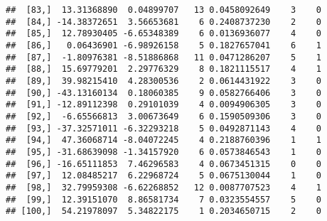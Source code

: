 \documentclass[]{article}
\begin{document}
\begin{verbatim}
##  [83,]  13.31368890  0.04899707   13 0.0458092649    3    0
##  [84,] -14.38372651  3.56653681    6 0.2408737230    2    0
##  [85,]  12.78930405 -6.65348389    6 0.0136936077    4    0
##  [86,]   0.06436901 -6.98926158    5 0.1827657041    6    1
##  [87,]  -1.80976381 -8.51886868   11 0.0471286207    5    1
##  [88,]  15.69779201  2.29776329    8 0.1821115517    4    1
##  [89,]  39.98215410  4.28300536    2 0.0614431922    3    0
##  [90,] -43.13160134  0.18060385    9 0.0582766406    3    0
##  [91,] -12.89112398  0.29101039    4 0.0094906305    3    0
##  [92,]  -6.65566813  3.00673649    6 0.1590509306    3    0
##  [93,] -37.32571011 -6.32293218    5 0.0492871143    4    0
##  [94,]  47.36068714 -8.04072245    4 0.2188760396    1    1
##  [95,] -31.68639098 -1.34157920    6 0.0573846543    1    0
##  [96,] -16.65111853  7.46296583    4 0.0673451315    0    0
##  [97,]  12.08485217  6.22968724    5 0.0675130044    1    0
##  [98,]  32.79959308 -6.62268852   12 0.0087707523    4    1
##  [99,]  12.39151070  8.86581734    7 0.0323554557    5    0
## [100,]  54.21978097  5.34822175    1 0.2034650715    2    0
\end{verbatim}
\end{document}

